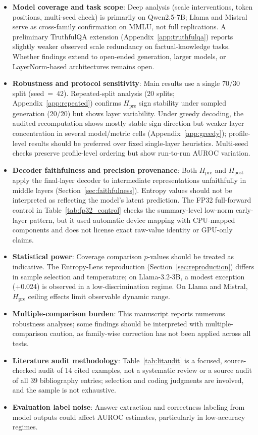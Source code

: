\documentclass{ieeeaccess}
\newcommand{\Hpre}{H_{\text{pre}}}
\newcommand{\Hpost}{H_{\text{post}}}
\begin{document}
\begin{itemize}
\item \textbf{Model coverage and task scope}: Deep analysis (scale interventions, token positions, multi-seed check) is primarily on Qwen2.5-7B; Llama and Mistral serve as cross-family confirmation on MMLU, not full replications. A preliminary TruthfulQA extension (Appendix~\ref{app:truthfulqa}) reports slightly weaker observed scale redundancy on factual-knowledge tasks. Whether findings extend to open-ended generation, larger models, or LayerNorm-based architectures remains open.

\item \textbf{Robustness and protocol sensitivity}: Main results use a single 70/30 split (seed~=~42). Repeated-split analysis (20 splits; Appendix~\ref{app:repeated}) confirms $\Hpre$ sign stability under sampled generation (20/20) but shows layer variability. Under greedy decoding, the audited recomputation shows mostly stable sign direction but weaker layer concentration in several model/metric cells (Appendix~\ref{app:greedy}); profile-level results should be preferred over fixed single-layer heuristics. Multi-seed checks preserve profile-level ordering but show run-to-run AUROC variation.

\item \textbf{Decoder faithfulness and precision provenance}: Both $\Hpre$ and $\Hpost$ apply the final-layer decoder to intermediate representations unfaithfully in middle layers (Section~\ref{sec:faithfulness}). Entropy values should not be interpreted as reflecting the model's latent prediction. The FP32 full-forward control in Table~\ref{tab:fp32_control} checks the summary-level low-norm early-layer pattern, but it used automatic device mapping with CPU-mapped components and does not license exact raw-value identity or GPU-only claims.

\item \textbf{Statistical power}: Coverage comparison $p$-values should be treated as indicative. The Entropy-Lens reproduction (Section~\ref{sec:reproduction}) differs in sample selection and temperature; on Llama-3.2-3B, a modest exception (+0.024) is observed in a low-discrimination regime. On Llama and Mistral, $\Hpre$ ceiling effects limit observable dynamic range.

\item \textbf{Multiple-comparison burden}: This manuscript reports numerous robustness analyses; some findings should be interpreted with multiple-comparison caution, as family-wise correction has not been applied across all tests.

\item \textbf{Literature audit methodology}: Table~\ref{tab:litaudit} is a focused, source-checked audit of 14 cited examples, not a systematic review or a source audit of all 39 bibliography entries; selection and coding judgments are involved, and the sample is not exhaustive.

\item \textbf{Evaluation label noise}: Answer extraction and correctness labeling from model outputs could affect AUROC estimates, particularly in low-accuracy regimes.
\end{itemize}
\end{document}
